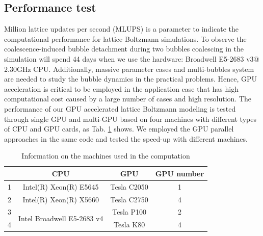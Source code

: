 \documentclass[10pt]{elsarticle}
\begin{document}
\subsection{Performance test}
Million lattice updates per second (MLUPS) is a parameter to indicate the computational performance for lattice Boltzmann simulations. To observe the coalescence-induced bubble detachment during two bubbles coalescing in the simulation will spend 44 days when we use the hardware: Broadwell E5-2683 v3@ 2.30GHz CPU. Additionally, massive parameter cases and multi-bubbles system are needed to study the bubble dynamics in the practical problems. Hence, GPU acceleration is critical to be employed in the application case that has high computational cost caused by a large number of cases and high resolution. The performance of our GPU accelerated lattice Boltzmann modeling is tested through single GPU and multi-GPU based on four machines with different types of CPU and GPU cards, as Tab. \ref{tab:machine} shows. We employed the GPU parallel approaches in the same code and tested the speed-up with different machines. 
\begin{table}[!htpb]
\centering
\small
\begin{tabular}{|c|c|c|c|}
  \hline
   & CPU & GPU & GPU number\\
   \hline
1 & Intel(R) Xeon(R) E5645 & Tesla C2050 & 1 \\
  \hline
2 & Intel(R) Xeon(R) X5660& Tesla C2750 & 4\\
\hline 
3 & \multirow{2}{*}{Intel Broadwell E5-2683 v4} &Tesla P100 & 2\\
  \cline{1-1}
  \cline{3-4} 
 4 &   &Tesla K80 & 4\\
  \hline 
\end{tabular}
\caption{Information on the machines used in the computation}
\label{tab:machine}
\end{table}
\end{document}
